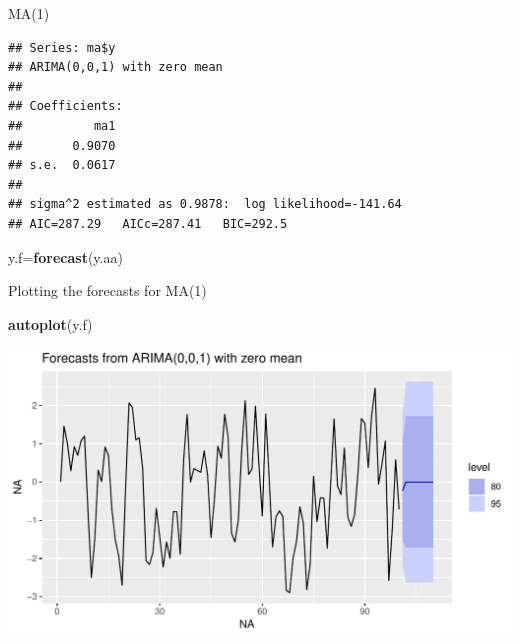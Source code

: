 \documentclass[ignorenonframetext,]{beamer}
\newenvironment{Shaded}{\begin{snugshade}}{\end{snugshade}}
\newcommand{\KeywordTok}[1]{\textcolor[rgb]{0.13,0.29,0.53}{\textbf{#1}}}
\newcommand{\NormalTok}[1]{#1}
\newcommand{\OperatorTok}[1]{\textcolor[rgb]{0.81,0.36,0.00}{\textbf{#1}}}
\begin{document}
\begin{frame}[fragile]{MA(1)}
\protect\hypertarget{ma1}{}

\begin{Shaded}
\end{Shaded}

\begin{verbatim}
## Series: ma$y 
## ARIMA(0,0,1) with zero mean 
## 
## Coefficients:
##          ma1
##       0.9070
## s.e.  0.0617
## 
## sigma^2 estimated as 0.9878:  log likelihood=-141.64
## AIC=287.29   AICc=287.41   BIC=292.5
\end{verbatim}

\begin{Shaded}
\begin{Highlighting}[]
\NormalTok{y.f=}\KeywordTok{forecast}\NormalTok{(y.aa)}
\end{Highlighting}
\end{Shaded}

\end{frame}

\begin{frame}[fragile]{Plotting the forecasts for MA(1)}
\protect\hypertarget{plotting-the-forecasts-for-ma1}{}

\begin{Shaded}
\begin{Highlighting}[]
\KeywordTok{autoplot}\NormalTok{(y.f)}
\end{Highlighting}
\end{Shaded}

\includegraphics{figure/unnamed-chunk-53-1.pdf}

\end{frame}
\end{document}
